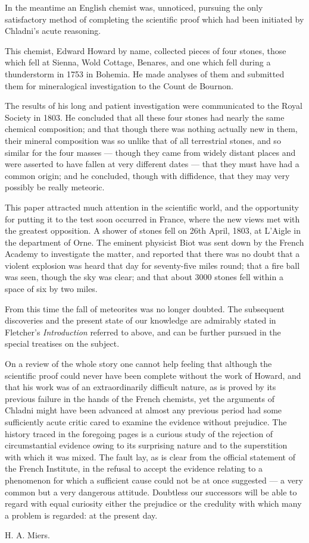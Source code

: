 \documentclass[a4paper, 11pt, oneside]{article}
\begin{document}
In the meantime an English chemist was, unnoticed, pursuing the only satisfactory method of completing the scientific proof which had been initiated by Chladni's acute reasoning.

This chemist, Edward Howard by name, collected pieces of four stones, those which fell at Sienna, Wold Cottage, Benares, and one which fell during a thunderstorm in 1753 in Bohemia. He made analyses of them and submitted them for mineralogical investigation to the Count de Bournon.

The results of his long and patient investigation were communicated to the Royal Society in 1803. He concluded that all these four stones had nearly the same chemical composition; and that though there was nothing actually new in them, their mineral composition was so unlike that of all terrestrial stones, and so similar for the four masses --- though they came from widely distant places and were asserted to have fallen at very different dates --- that they must have had a common origin; and he concluded, though with diffidence, that they may very possibly be really meteoric.

This paper attracted much attention in the scientific world, and the opportunity for putting it to the test soon occurred in France, where the new views met with the greatest opposition. A shower of stones fell on 26th April, 1803, at L'Aigle in the department of Orne. The eminent physicist Biot was sent down by the French Academy to investigate the matter, and reported that there was no doubt that a violent explosion was heard that day for seventy-five miles round; that a fire ball was seen, though the sky was clear; and that about 3000 stones fell within a space of six by two miles.

From this time the fall of meteorites was no longer doubted. The subsequent discoveries and the present state of our knowledge are admirably stated in Fletcher's \emph{Introduction} referred to above, and can be further pursued in the special treatises on the subject.

On a review of the whole story one cannot help feeling that although the scientific proof could never have been complete without the work of Howard, and that his work was of an extraordinarily difficult nature, as is proved by its previous failure in the hands of the French chemists, yet the arguments of Chladni might have been advanced at almost any previous period had some sufficiently acute critic cared to examine the evidence without prejudice. The history traced in the foregoing pages is a curious study of the rejection of circumstantial evidence owing to its surprising nature and to the superstition with which it was mixed. The fault lay, as is clear from the official statement of the French Institute, in the refusal to accept the evidence relating to a phenomenon for which a sufficient cause could not be at once suggested --- a very common but a very dangerous attitude. Doubtless our successors will be able to regard with equal curiosity either the prejudice or the credulity with which many a problem is regarded: at the present day.

\bigskip{}

H. A. Miers.
\end{document}
